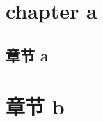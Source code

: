 \documentclass[openright, oneside]{gdutthesis}
\begin{document}
\frontmatter %
\tableofcontents

\mainmatter%

\chapter{chapter a}
\translateenglish%
\lipsum%
%

\begin{abstract}{chinese,projecttype=false}
  \translatechinese%
  \zhlipsum[1]
\end{abstract}

\begin{nocleardoublepage}
\chapter{章节 a}
\end{nocleardoublepage}
\zhlipsum[1-4]

\chapter{章节 b}
\zhlipsum[1-4]
\end{document}
